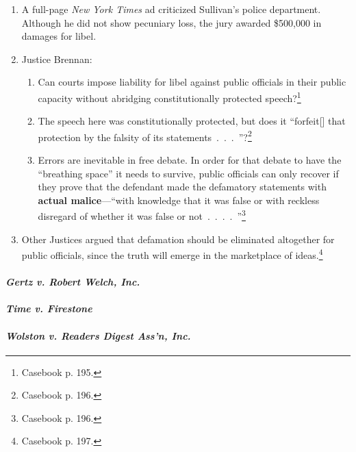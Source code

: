 \begin{enumerate}
    \item A full-page \emph{New York Times} ad criticized Sullivan's police 
    department. Although he did not show pecuniary loss, the jury awarded 
    \$500,000 in damages for libel.
    \item Justice Brennan:
    \begin{enumerate}
        \item Can courts impose liability for libel against public officials in 
        their public capacity without abridging constitutionally protected 
        speech?\footnote{Casebook p. 195.}
        \item The speech here was constitutionally protected, but does it 
        ``forfeit[] that protection by the falsity of its 
        statements~.~.~.~''?\footnote{Casebook p. 196.}
        \item Errors are inevitable in free debate. In order for that debate to 
        have the ``breathing space'' it needs to survive, public officials can 
        only recover if they prove that the defendant made the defamatory 
        statements with \textbf{actual malice}---``with knowledge that it was 
        false or with reckless disregard of whether it was false or 
        not~.~.~.~.~''\footnote{Casebook p. 196.}
    \end{enumerate}
    \item Other Justices argued that defamation should be eliminated altogether 
    for public officials, since the truth will emerge in the marketplace of 
    ideas.\footnote{Casebook p. 197.}
\end{enumerate}

\paragraph{\emph{Gertz v. Robert Welch, Inc.}}


\paragraph{\emph{Time v. Firestone}}


\paragraph{\emph{Wolston v. Readers Digest Ass'n, Inc.}}

